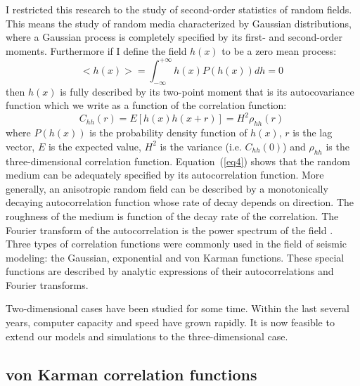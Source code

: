 I restricted this research to the study of second-order statistics of random
fields. This means the study of random media characterized by Gaussian 
distributions, where a Gaussian process is completely specified by its first-
and second-order moments. Furthermore if I define the field $h(x)$ to be 
a zero mean process:
\begin{equation}
<h(x)>=\int_{-\infty}^{+\infty}h(x)P(h(x))dh=0 \
\label {eq3}
\end{equation}
then $h(x)$ is fully described by its two-point moment that is its autocovariance 
function which we write as a function of the correlation function:
\begin{equation}
C_{hh}(r)=E[h(x)h(x+r)]=H^2\rho_{hh}(r) \
\label {eq4}
\end{equation}
where $P(h(x))$ is the probability density function of $h(x)$,
$r$ is the lag vector, $E$ is the expected value, $H^2$ is the variance
(i.e. $C_{hh}(0)$) and $\rho_{hh}$ is the three-dimensional correlation function.
Equation~(\ref {eq4}) shows that the random medium can 
be adequately specified by its 
autocorrelation function. More generally, an anisotropic random field can be
described by a monotonically decaying autocorrelation function whose rate of
decay depends on direction. The roughness of the medium is function of the 
decay rate of the correlation. The Fourier transform of the autocorrelation is 
the power spectrum of the field \cite{Bracewell}. Three types of correlation
functions were commonly used in the field of seismic modeling: the Gaussian,
exponential and von Karman functions. These special functions are described by
analytic expressions of their autocorrelations and Fourier transforms. 
\par
Two-dimensional cases have been studied for some
time\cite{Wu,Frankel,Goff,Holliger1,Holliger2}.
Within the last several years, computer capacity and speed have grown rapidly.
It is now feasible to extend our models and simulations to the 
three-dimensional case.

\subsection { von Karman correlation functions }

